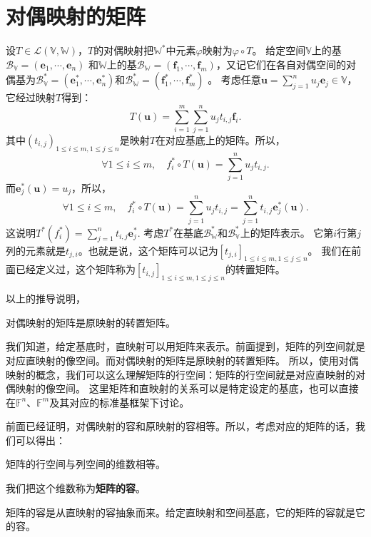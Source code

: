 \documentclass[12pt,UTF8,fontset=none]{ctexbook}
\begin{document}
\section{对偶映射的矩阵}
设$T \in \mathcal{L}(\mathbb{V}, \mathbb{W})$，$T$的对偶映射把$\mathbb{W}^*$中元素$\varphi$映射为$\varphi \circ T$。
给定空间$\mathbb{V}$上的基$\mathcal{B}_\mathbb{V} = (\mathbf{e}_1, \cdots, \mathbf{e}_n)$
和$\mathbb{W}$上的基$\mathcal{B}_\mathbb{W} = (\mathbf{f}_1, \cdots, \mathbf{f}_m)$，又记它们在各自对偶空间的对偶基为$\mathcal{B}_\mathbb{V}^* = (\mathbf{e}_1^*, \cdots, \mathbf{e}_n^*)$和$\mathcal{B}_\mathbb{W}^* = (\mathbf{f}_1^*, \cdots, \mathbf{f}_m^*)$ 。
考虑任意$\mathbf{u} = \sum_{j=1}^n u_j \mathbf{e}_j \in \mathbb{V}$，它经过映射$T$得到：
$$ T(\mathbf{u}) =  \sum_{i=1}^m \sum_{j=1}^n u_j t_{i,j} \mathbf{f}_i.$$
其中$(t_{i, j})_{1\leqslant i\leqslant m, 1\leqslant j\leqslant n}$是映射$T$在对应基底上的矩阵。所以，
$$ \forall 1\leqslant i\leqslant m, \quad f_i^*\circ T(\mathbf{u}) = \sum_{j=1}^n u_j t_{i,j}.$$
而$\mathbf{e}_j^*(\mathbf{u}) = u_j$，所以，
$$ \forall 1\leqslant i\leqslant m, \quad f_i^*\circ T(\mathbf{u}) = \sum_{j=1}^n u_j t_{i,j} = \sum_{j=1}^n t_{i,j} \mathbf{e}_j^*(\mathbf{u}).$$
这说明$T^*(f_i^*) = \sum_{j=1}^n t_{i,j} \mathbf{e}_j^* $. 
考虑$T^*$在基底$\mathcal{B}_\mathbb{W}^*$和$\mathcal{B}_\mathbb{V}^*$上的矩阵表示。
它第$i$行第$j$列的元素就是$t_{j,i}$。也就是说，这个矩阵可以记为$[t_{j,i}]_{1\leqslant i\leqslant m, 1\leqslant j\leqslant n}$。
我们在前面已经定义过，这个矩阵称为$[t_{i,j}]_{1\leqslant i\leqslant m, 1\leqslant j\leqslant n}$的转置矩阵。

以上的推导说明，
\begin{pp}\label{pp:5_4}
对偶映射的矩阵是原映射的转置矩阵。
\end{pp}

我们知道，给定基底时，直映射可以用矩阵来表示。前面提到，矩阵的列空间就是对应直映射的像空间。而对偶映射的矩阵是原映射的转置矩阵。
所以，使用对偶映射的概念，我们可以这么理解矩阵的行空间：矩阵的行空间就是对应直映射的对偶映射的像空间。
这里矩阵和直映射的关系可以是特定设定的基底，也可以直接在$\mathbb{F}^n$、$\mathbb{F}^m$及其对应的标准基框架下讨论。

前面已经证明，对偶映射的容和原映射的容相等。所以，考虑对应的矩阵的话，我们可以得出：

\begin{pp}\label{pp:5_5}
矩阵的行空间与列空间的维数相等。
\end{pp}
我们把这个维数称为\textbf{矩阵的容}。

矩阵的容是从直映射的容抽象而来。给定直映射和空间基底，它的矩阵的容就是它的容。
\end{document}
